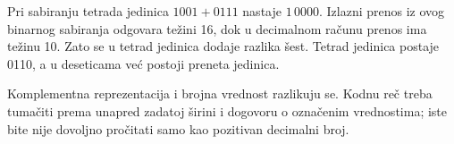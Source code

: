 Pri sabiranju tetrada jedinica $1001+0111$ nastaje $1\,0000$. Izlazni prenos iz ovog binarnog sabiranja odgovara težini 16, dok u decimalnom računu prenos ima težinu 10. Zato se u tetrad jedinica dodaje razlika šest. Tetrad jedinica postaje 0110, a u deseticama već postoji preneta jedinica.

Komplementna reprezentacija i brojna vrednost razlikuju se. Kodnu reč treba tumačiti prema unapred zadatoj širini i dogovoru o označenim vrednostima; iste bite nije dovoljno pročitati samo kao pozitivan decimalni broj.
